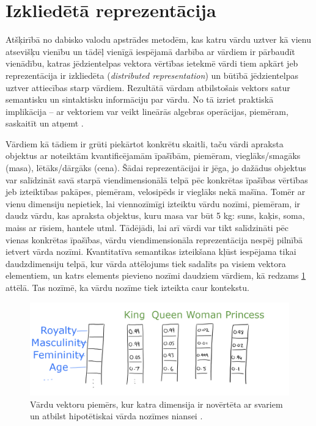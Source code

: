 \section{Izkliedētā reprezentācija}

Atšķirībā no dabisko valodu apstrādes metodēm, kas katru vārdu uztver kā vienu atsevišķu vienību un tādēļ vienīgā iespējamā darbība ar vārdiem ir pārbaudīt vienādību, katras jēdzientelpas vektora vērtības ietekmē vārdi tiem apkārt jeb reprezentācija ir izkliedēta (\textit{distributed representation}) un būtībā jēdzientelpas uztver attiecības starp vārdiem. Rezultātā vārdam atbilstošais vektors satur semantisku un sintaktisku informāciju par vārdu. No tā izriet praktiskā implikācija -- ar vektoriem var veikt lineārās algebras operācijas, piemēram, saskaitīt un atņemt \cite{colyer2016}.

Vārdiem kā tādiem ir grūti piekārtot konkrētu skaitli, taču vārdi apraksta objektus ar noteiktām kvantificējamām īpašībām, piemēram, vieglāks/smagāks (masa), lētāks/dārgāks (cena). Šādai reprezentācijai ir jēga, jo dažādus objektus var salīdzināt savā starpā viendimensionālā telpā pēc konkrētas īpašības vērtības jeb izteiktības pakāpes, piemēram, velosipēds ir vieglāks nekā mašīna. Tomēr ar vienu dimensiju nepietiek, lai viennozīmīgi izteiktu vārdu nozīmi, piemēram, ir daudz vārdu, kas apraksta objektus, kuru masa var būt 5 kg: suns, kaķis, soma, maiss ar rīsiem, hantele utml. Tādējādi, lai arī vārdi var tikt salīdzināti pēc vienas konkrētas īpašības, vārdu viendimensionāla reprezentācija nespēj pilnībā ietvert vārda nozīmi. Kvantitatīva semantikas izteikšana kļūst iespējama tikai daudzdimensiju telpā, kur vārda attēlojums tiek sadalīts pa visiem vektora elementiem, un katrs elements pievieno nozīmi daudziem vārdiem, kā redzams \ref{fig:distributed-representation} attēlā. Tas nozīmē, ka vārdu nozīme tiek izteikta caur kontekstu.


\begin{figure}[h]
	\centering
	\includegraphics[width=\textwidth]{figures/word2vec-distributed-representation.png}
	\caption{Vārdu vektoru piemērs, kur katra dimensija ir novērtēta ar svariem un atbilst hipotētiskai vārda nozīmes niansei \cite{colyer2016}.}
	\label{fig:distributed-representation}
\end{figure}

